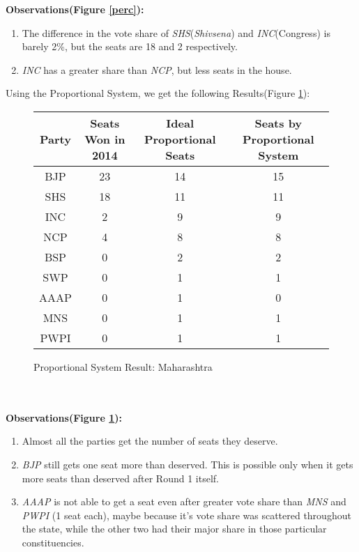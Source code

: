 \documentclass{article}
\begin{document}
\textbf{Observations(Figure \ref{perc}):} 
\begin{enumerate}
\item The difference in the vote share of \emph{SHS}(\emph{Shivsena}) and \emph{INC}(Congress) is barely 2\%, but the seats are 18 and 2 respectively.
\item \emph{INC} has a greater share than \emph{NCP}, but less seats in the house.
\end{enumerate}

Using the Proportional System, we get the following Results(Figure \ref{props}):
\begin{figure}[h!]
\begin{center}
\begin{tabular}{|c|c|c|c|}
\hline
\textbf{Party} & \textbf{Seats Won in 2014} & \textbf{Ideal Proportional Seats} & \textbf{Seats by Proportional System}\\
\hline
BJP & 23 & 14 & 15\\
SHS & 18 & 11 & 11\\
INC & 2 & 9 & 9\\
NCP & 4 & 8 & 8\\
BSP & 0 & 2 & 2\\
SWP & 0 & 1 & 1\\
AAAP & 0 & 1 & 0\\
MNS & 0 & 1 & 1\\
PWPI & 0 & 1 & 1\\
\hline
\end{tabular}
\caption{Proportional System Result: Maharashtra}
\label{props}
\end{center}
\end{figure}
\\ \\
\textbf{Observations(Figure \ref{props}):}
\begin{enumerate}
\item Almost all the parties get the number of seats they deserve.
\item \emph{BJP} still gets one seat more than deserved. This is possible only when it gets more seats than deserved after Round 1 itself.
\item \emph{AAAP} is not able to get a seat even after greater vote share than \emph{MNS} and \emph{PWPI} (1 seat each), maybe because it's vote share was scattered throughout the state, while the other two had their major share in those particular constituencies.
\end{enumerate}
\newpage
\end{document}
